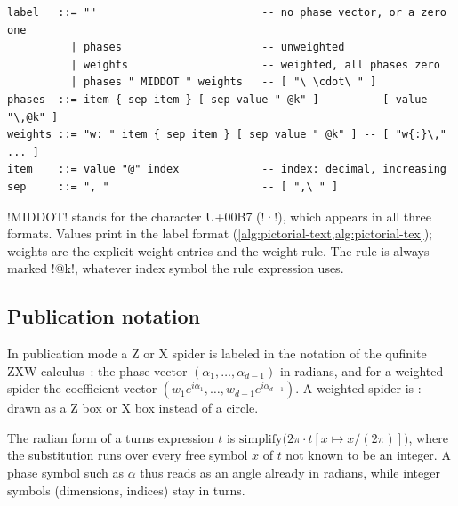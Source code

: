 {\begin{lstlisting}[style=grammar,caption={Engine label grammar (formats \texttt{uni} and \texttt{ascii}; the \texttt{tex} variants in brackets).}]
label   ::= ""                          -- no phase vector, or a zero one
          | phases                      -- unweighted
          | weights                     -- weighted, all phases zero
          | phases " MIDDOT " weights   -- [ "\ \cdot\ " ]
phases  ::= item { sep item } [ sep value " @k" ]       -- [ value "\,@k" ]
weights ::= "w: " item { sep item } [ sep value " @k" ] -- [ "w{:}\," ... ]
item    ::= value "@" index             -- index: decimal, increasing
sep     ::= ", "                        -- [ ",\ " ]
\end{lstlisting}
\code!MIDDOT! stands for the character U+00B7 (\pgi!·!), which appears in all three formats.
Values print in the label format (\cref{alg:pictorial-text,alg:pictorial-tex}); weights are the
explicit weight entries and the weight rule. The rule is always marked \code!@k!, whatever index
symbol the rule expression uses.

\subsection{Publication notation}\label{sec:pictorial-paper-labels}

In publication mode a Z or X spider is labeled in the notation of the qufinite ZXW
calculus~\cite{wang2023qufinitezxw,poor2023zxw}: the phase vector
$(\alpha_1,\dots,\alpha_{d-1})$ in radians, and for a weighted spider the coefficient vector
$(w_1 e^{i\alpha_1},\dots,w_{d-1}e^{i\alpha_{d-1}})$. A weighted spider is : drawn
as a Z box or X box instead of a circle.

\begin{definition}[Radians]\label{def:pictorial-radians}
The radian form of a turns expression $t$ is
$\mathrm{simplify}\bigl(2\pi\cdot t[x\mapsto x/(2\pi)]\bigr)$, where the substitution runs over
every free symbol $x$ of $t$ not known to be an integer. A phase symbol such as $\alpha$ thus
reads as an angle already in radians, while integer symbols (dimensions, indices) stay in turns.
\end{definition}

}
